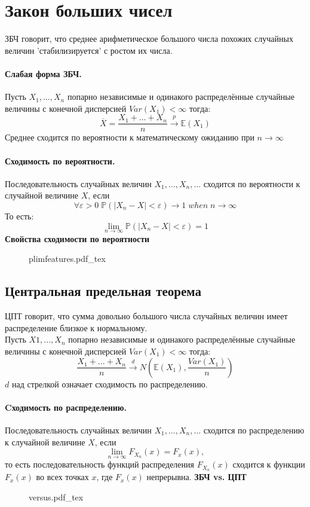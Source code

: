 \documentclass{article}
\newcommand{\E}{\mathbb{E}}
\newcommand{\PP}{\mathbb{P}}
\newcommand{\incfig}[2][1]{%
    \def\svgwidth{#1\columnwidth}
    {#2.pdf_tex}
}
\begin{document}
\section{Закон больших чисел}
ЗБЧ говорит, что среднее арифметическое большого числа похожих случайных величин 'стабилизируется' с ростом их числа.
\paragraph{Слабая форма ЗБЧ.} Пусть $X_1,...,X_n$ попарно независимые и одинакого распределённые случайные величины с конечной дисперсией $Var(X_1)<\infty$ тогда:
\[
{\overline X} = \frac{X_1+...+X_n}{n} \xrightarrow{p} \E(X_1)
\]
Среднее сходится по вероятности к математическому ожиданию при $n \rightarrow \infty$
\paragraph{Сходимость по вероятности.}
Последовательность случайных величин $X_1,...,X_n,...$ сходится по вероятности к случайной величине $X$, если
\[
\forall \varepsilon > 0 \; \PP(|X_n - X|<\varepsilon) \rightarrow 1 \; when \; n \rightarrow \infty
\]
То есть:
\[
\lim_{n \rightarrow \infty} \PP(|X_n - X|<\varepsilon) = 1
\]
{\bf Свойства сходимости по вероятности}
\begin{figure}[h!]
  \centering
  \incfig{plimfeatures}
\end{figure}
\subsection{Центральная предельная теорема}
ЦПТ говорит, что сумма довольно большого числа случайных величин имеет распределение близкое к нормальному.
\\
Пусть $X1,...,X_n$ попарно независимые и одинакого распределённые случайные величины с конечной дисперсией $Var(X_1)<\infty$ тогда: 
\[
\frac{X_1 + ...+X_n}{n} \xrightarrow{d} N(\E(X_1),\frac{Var(X_1)}{n})
\]
$d$ над стрелкой означает сходимость по распределению.
\paragraph{Cходимость по распределению.}
Последовательность случайных величин $X_1,...,X_n,...$ сходится по распределению к случайной величине $X$, если 
\[
\lim_{n \rightarrow \infty} F_{X_n}(x)=F_x(x),
\]
то есть последовательность функций распределения $F_{X_n}(x)$ сходится к функции $F_x(x)$ во всех точках $x$, где $F_x(x)$ непрерывна.
\newpage
{\bf ЗБЧ vs. ЦПТ}
\begin{figure}[h!]
  \centering
  \incfig{versus}
\end{figure}
\end{document}

